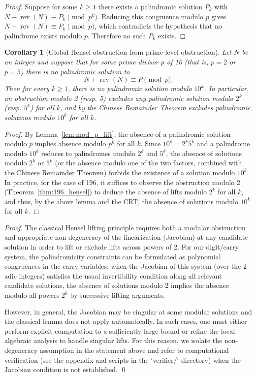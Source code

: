 \documentclass[12pt,a4paper]{article}
\newtheorem{corollary}[theorem]{Corollary}
\begin{document}
\begin{proof}
Suppose for some $k\ge1$ there exists a palindromic solution $P_k$ with
$N+\operatorname{rev}(N)\equiv P_k\pmod{p^k}$. Reducing this congruence modulo $p$ gives
$N+\operatorname{rev}(N)\equiv P_k\pmod p$, which contradicts the hypothesis that no palindrome exists modulo $p$. Therefore no such $P_k$ exists.
\end{proof}

\begin{corollary}[Global Hensel obstruction from prime-level obstruction]\label{cor:prime_to_power-11}
Let $N$ be an integer and suppose that for some prime divisor $p$ of 10 (that is, $p = 2$ or $p = 5$) there is no palindromic solution to
\[
N + \operatorname{rev}(N) \equiv P \pmod p.
\]
Then for every $k \geq 1$, there is no palindromic solution modulo $10^k$. In particular, an obstruction modulo 2 (resp. 5) excludes any palindromic solution modulo $2^k$ (resp. $5^k$) for all $k$, and by the Chinese Remainder Theorem excludes palindromic solutions modulo $10^k$ for all $k$.
\end{corollary}

\begin{proof}
By Lemma~\ref{lem:mod_p_lift}, the absence of a palindromic solution modulo $p$ implies absence modulo $p^k$ for all $k$. Since $10^k = 2^k 5^k$ and a palindrome modulo $10^k$ reduces to palindromes modulo $2^k$ and $5^k$, the absence of solutions modulo $2^k$ or $5^k$ (or the absence modulo one of the two factors, combined with the Chinese Remainder Theorem) forbids the existence of a solution modulo $10^k$. In practice, for the case of 196, it suffices to observe the obstruction modulo 2 (Theorem~\ref{thm:196_hensel}) to deduce the absence of lifts modulo $2^k$ for all $k$, and thus, by the above lemma and the CRT, the absence of solutions modulo $10^k$ for all $k$.
\end{proof}

\begin{proof}
The classical Hensel lifting principle requires both a modular obstruction and appropriate non-degeneracy of the linearization (Jacobian) at any candidate solution in order to lift or exclude lifts across powers of 2. For our digit/carry system, the palindromicity constraints can be formulated as polynomial congruences in the carry variables; when the Jacobian of this system (over the 2-adic integers) satisfies the usual invertibility condition along all relevant candidate solutions, the absence of solutions modulo 2 implies the absence modulo all powers $2^k$ by successive lifting arguments.

However, in general, the Jacobian may be singular at some modular solutions and the classical lemma does not apply automatically. In such cases, one must either perform explicit computation to a sufficiently large bound or refine the local algebraic analysis to handle singular lifts. For this reason, we isolate the non-degeneracy assumption in the statement above and refer to computational verification (see the appendix and scripts in the `verifier/` directory) when the Jacobian condition is not established.
\qed
\end{proof}
\end{document}
